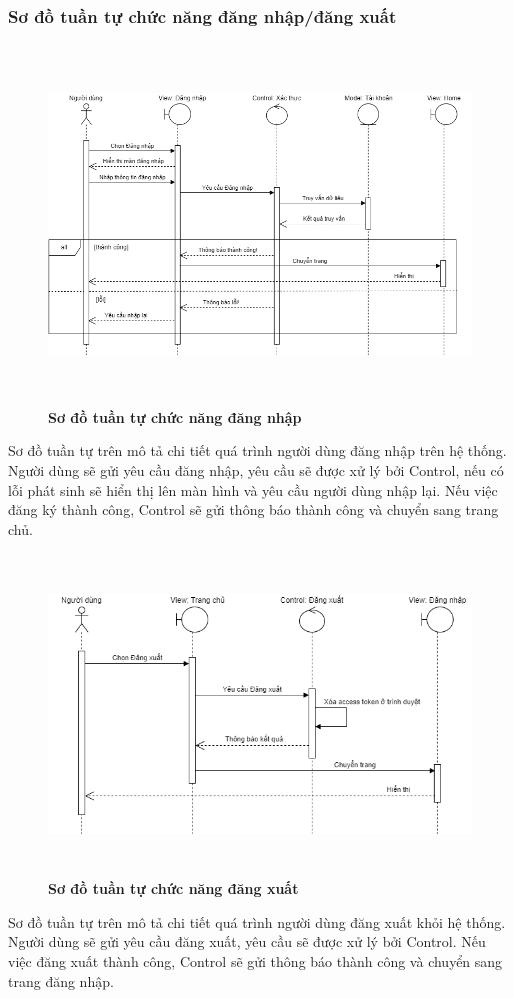 \subsubsection{Sơ đồ tuần tự chức năng đăng nhập/đăng xuất}
\begin{figure}[H]
  \centering
  \includegraphics[width=14.5cm,height=9.5cm]{Images/sequence/sequence_login.png}
  \caption[Sơ đồ tuần tự chức năng đăng nhập]{\bfseries \fontsize{12pt}{0pt}
  \selectfont Sơ đồ tuần tự chức năng đăng nhập}
  \label{sequence_login} %
\end{figure}
Sơ đồ tuần tự trên mô tả chi tiết quá trình người dùng đăng nhập trên hệ thống. Người dùng sẽ gửi yêu cầu đăng nhập, yêu cầu sẽ được xử lý
bởi Control, nếu có lỗi phát sinh sẽ hiển thị lên màn hình và yêu cầu người dùng nhập lại. Nếu việc đăng ký thành công, Control sẽ gửi thông báo 
thành công và chuyển sang trang chủ. 
\begin{figure}[H]
  \centering
  \includegraphics[width=14cm,height=8.5cm]{Images/sequence/sequence_logout.png}
  \caption[Sơ đồ tuần tự chức năng đăng xuất]{\bfseries \fontsize{12pt}{0pt}
  \selectfont Sơ đồ tuần tự chức năng đăng xuất}
  \label{sequence_logout} %
\end{figure}
Sơ đồ tuần tự trên mô tả chi tiết quá trình người dùng đăng xuất khỏi hệ thống. Người dùng sẽ gửi yêu cầu đăng xuất, yêu cầu sẽ được xử lý
bởi Control. Nếu việc đăng xuất thành công, Control sẽ gửi thông báo 
thành công và chuyển sang trang đăng nhập. 

